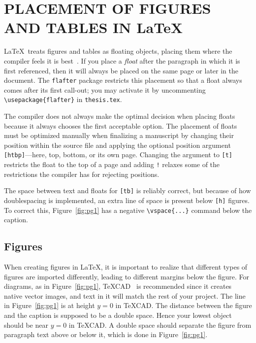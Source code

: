 \chapter{PLACEMENT OF FIGURES AND TABLES IN \LaTeX }\label{chap2:body1}

\LaTeX\ treats figures and tables as floating objects, placing them where the compiler feels it is best~\cite{mittelbach2014}.
If you place a \emph{float} after the paragraph in which it is first referenced, then it will always be placed on the same page or later in the document.
The \verb+flafter+ package restricts this placement so that a float always comes after its first call-out; you may activate it by uncommenting \verb+\usepackage{flafter}+ in \verb+thesis.tex+.

The compiler does not always make the optimal decision when placing floats because it always chooses the first acceptable option.
The placement of floats must be optimized manually when finalizing a manuscript by changing their position within the source file and applying the optional position argument \verb+[htbp]+---here, top, bottom, or its own page.
Changing the argument to \verb+[t]+ restricts the float to the top of a page and adding \verb+!+ relaxes some of the restrictions the compiler has for rejecting positions.

The space between text and floats for \verb+[tb]+ is reliably correct, but because of how doublespacing is implemented, an extra line of space is present below \verb+[h]+ figures.
To correct this, Figure~\ref{fig:pg1} has a negative \verb+\vspace{...}+ command below the caption.


\section{Figures}

When creating figures in \LaTeX, it is important to realize that different types of figures are imported differently, leading to different margins below the figure.
For diagrams, as in Figure~\ref{fig:pg1}, \TeX CAD~\cite{texcad} is recommended since it creates native vector images, and text in it will match the rest of your project.
The line in Figure~\ref{fig:pg1} is at height $y=0$ in \TeX CAD.
The distance between the figure and the caption is supposed to be a double space.
Hence your lowest object should be near $y=0$ in \TeX CAD.
A double space should separate the figure from paragraph text above or below it, which is done in Figure~\ref{fig:pg1}.

